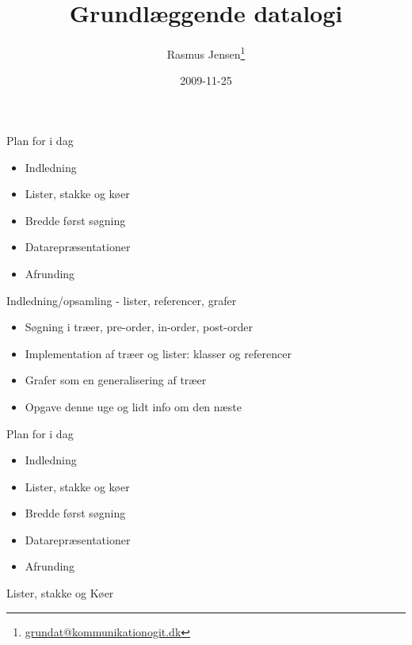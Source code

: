 \documentclass[a4paper,landscape]{slides}
\title{Grundlæggende datalogi}
\author{Rasmus Jensen\footnote{\url{grundat@kommunikationogit.dk}}}
\date{2009-11-25}
\begin{document}
\maketitle
\begin{slide} \begin{center} {\large 
            Plan for i dag
} \end{center} \begin{itemize} \addtolength{\itemsep}{-\baselineskip}
\item Indledning
\item Lister, stakke og køer
\item Bredde først søgning
\item Datarepræsentationer
\item Afrunding
\end{itemize}\end{slide}\begin{slide} \begin{center} {\large 

      Indledning/opsamling - lister, referencer, grafer
} \end{center} \begin{itemize} \addtolength{\itemsep}{-\baselineskip}
      \item     Søgning i træer, pre-order, in-order, post-order
      \item     Implementation af træer og lister: klasser og referencer
      \item     Grafer som en generalisering af træer
      \item     Opgave denne uge og lidt info om den næste
\end{itemize}\end{slide}\begin{slide} \begin{center} {\large 
            Plan for i dag
} \end{center} \begin{itemize} \addtolength{\itemsep}{-\baselineskip}
\item Indledning
\item Lister, stakke og køer
\item Bredde først søgning
\item Datarepræsentationer
\item Afrunding
\end{itemize}\end{slide}\begin{slide} \begin{center} {\large 
      Lister, stakke og Køer
} \end{center} \begin{itemize} \addtolength{\itemsep}{-\baselineskip}

\end{itemize}
\end{slide}
\end{document}
